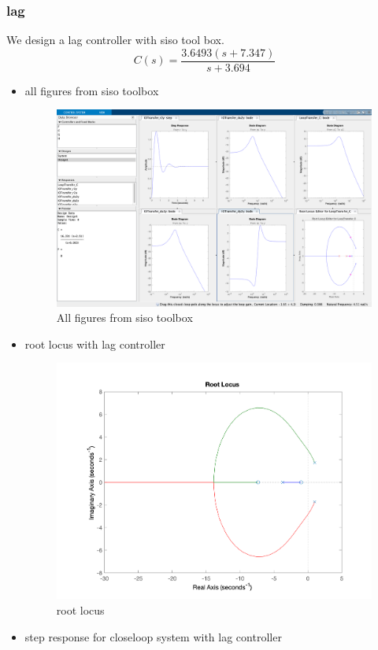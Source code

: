 \subsubsection{lag}
We design a lag controller with siso tool box.
$$
C(s) = \dfrac{3.6493(s + 7.347)}{s + 3.694} 
$$
\begin{itemize}
	\item all figures from siso toolbox
	\begin{figure}[H]
		\caption{All figures from siso toolbox}
		\centering
		\includegraphics[width=16cm]{../Figure/Q1/Q1_b/lag/siso_all.png}
	\end{figure}
	\newpage
	\item root locus with lag controller
	\begin{figure}[H]
		\caption{root locus}
		\centering
		\includegraphics[width=12cm]{../Figure/Q1/Q1_b/lag/rlocus.png}
	\end{figure}
	\item step response for closeloop system with lag controller

\end{itemize}
